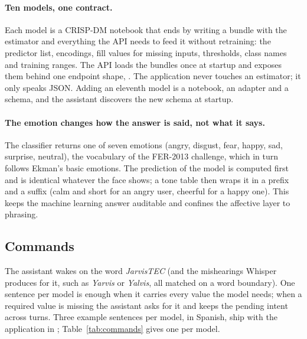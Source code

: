 \paragraph{Ten models, one contract.}
Each model is a CRISP-DM notebook that ends by writing a
 bundle with the estimator and everything the API needs to feed
it without retraining: the predictor list, encodings, fill values for
missing inputs, thresholds, class names and training ranges. The API loads
the bundles once at startup and exposes them behind one endpoint shape,
. The application never touches an
estimator; it only speaks JSON. Adding an eleventh model is a notebook, an
adapter and a schema, and the assistant discovers the new schema at startup.

\paragraph{The emotion changes how the answer is said, not what it says.}
The classifier returns one of seven emotions (angry, disgust, fear, happy,
sad, surprise, neutral), the vocabulary of the FER-2013 challenge, which in turn follows Ekman's basic emotions. The prediction of the model is computed first and is
identical whatever the face shows; a tone table then wraps it in a prefix
and a suffix (calm and short for an angry user, cheerful for a happy one).
This keeps the machine learning answer auditable and confines the affective
layer to phrasing.

\subsection{Commands}

The assistant wakes on the word \emph{JarvisTEC} (and the mishearings
Whisper produces for it, such as \emph{Yarvis} or \emph{Yalvis}, all matched on
a word boundary). One sentence per model is enough when it carries every
value the model needs; when a required value is missing the assistant asks
for it and keeps the pending intent across turns. Three example sentences
per model, in Spanish, ship with the application in ;
Table~\ref{tab:commands} gives one per model.

